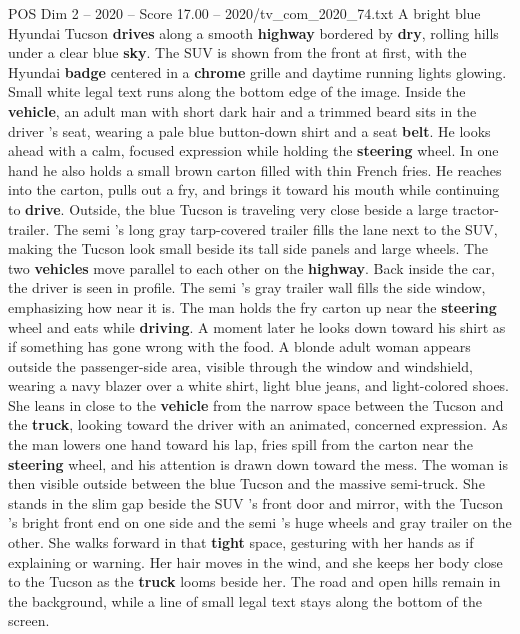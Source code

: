 \begin{textsample}{POS Dim 2 – 2020 – Score 17.00 – 2020/tv\_com\_2020\_74.txt}  \label{ex:f2_pos_048}
A bright blue Hyundai Tucson \textbf{drives} along a smooth \textbf{highway} bordered by \textbf{dry}, rolling hills under a clear blue \textbf{sky}.
The SUV is shown from the front at first, with the Hyundai \textbf{badge} centered in a \textbf{chrome} grille and daytime running lights glowing.
Small white legal text runs along the bottom edge of the image.
Inside the \textbf{vehicle}, an adult man with short dark hair and a trimmed beard sits in the driver ’s seat, wearing a pale blue button-down shirt and a seat \textbf{belt}.
He looks ahead with a calm, focused expression while holding the \textbf{steering} wheel.
In one hand he also holds a small brown carton filled with thin French fries.
He reaches into the carton, pulls out a fry, and brings it toward his mouth while continuing to \textbf{drive}.
Outside, the blue Tucson is traveling very close beside a large tractor-trailer.
The semi ’s long gray tarp-covered trailer fills the lane next to the SUV, making the Tucson look small beside its tall side panels and large wheels.
The two \textbf{vehicles} move parallel to each other on the \textbf{highway}.
Back inside the car, the driver is seen in profile.
The semi ’s gray trailer wall fills the side window, emphasizing how near it is.
The man holds the fry carton up near the \textbf{steering} wheel and eats while \textbf{driving}.
A moment later he looks down toward his shirt as if something has gone wrong with the food.
A blonde adult woman appears outside the passenger-side area, visible through the window and windshield, wearing a navy blazer over a white shirt, light blue jeans, and light-colored shoes.
She leans in close to the \textbf{vehicle} from the narrow space between the Tucson and the \textbf{truck}, looking toward the driver with an animated, concerned expression.
As the man lowers one hand toward his lap, fries spill from the carton near the \textbf{steering} wheel, and his attention is drawn down toward the mess.
The woman is then visible outside between the blue Tucson and the massive semi-truck.
She stands in the slim gap beside the SUV ’s front door and mirror, with the Tucson ’s bright front end on one side and the semi ’s huge wheels and gray trailer on the other.
She walks forward in that \textbf{tight} space, gesturing with her hands as if explaining or warning.
Her hair moves in the wind, and she keeps her body close to the Tucson as the \textbf{truck} looms beside her.
The road and open hills remain in the background, while a line of small legal text stays along the bottom of the screen.

\end{textsample}

